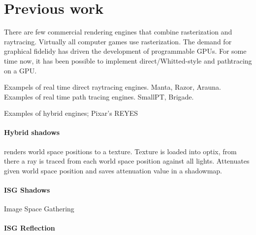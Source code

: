 \section{Previous work}

There are few commercial rendering engines that combine rasterization and raytracing. Virtually all computer games use rasterization. The demand for graphical fidelidy has driven the development of programmable GPUs. For some time now, it has been possible to implement direct/Whitted-style and pathtracing on a GPU.

Exampels of real time direct raytracing engines. Manta, Razor, Arauna.
Examples of real time path tracing engines. SmallPT, Brigade.

Examples of hybrid engines; Pixar's REYES

\paragraph{Hybrid shadows} renders world space positions to a texture. Texture is loaded into optix, from there a ray is traced from each world space position against all lights. Attenuates given world space position and saves attenuation value in a shadowmap.

\paragraph{ISG Shadows} Image Space Gathering \cite{nvidiarobison09}
\paragraph{ISG Reflection}

